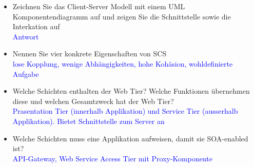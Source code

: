 \begin{itemize}
    \item Zeichnen Sie das Client-Server Modell mit einem UML Komponentendiagramm auf und zeigen Sie die Schnittstelle sowie die Interkation auf \\
    \textcolor{blue}{Antwort}
    \item Nennen Sie vier konkrete Eigenschaften von SCS \\
    \textcolor{blue}{lose Kopplung, wenige Abhängigkeiten, hohe Kohäsion, wohldefinierte Aufgabe}
    \item Welche Schichten enthalten der Web Tier? Welche Funktionen übernehmen diese und welchen Gesamtzweck hat der Web Tier? \\
    \textcolor{blue}{Prasentation Tier (innerhalb Applikation) und Service Tier (ausserhalb Applikation). Bietet Schnittstelle zum Server an}
    \item Welche Schichten muss eine Applikation aufweisen, damit sie SOA-enabled ist? \\
    \textcolor{blue}{API-Gateway, Web Service Access Tier mit Proxy-Komponente}
\end{itemize}
